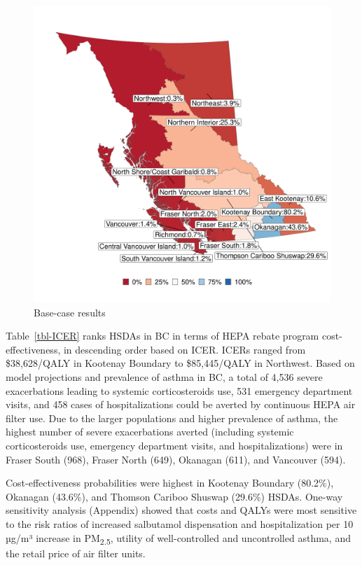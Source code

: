 \documentclass[
  number]{elsarticle}
\begin{document}
\begin{figure}
\begin{minipage}[t]{0.50\linewidth}
{{\includegraphics{index_files/figure-pdf/fig-ICER-2.pdf}

}

}

\end{minipage}%

\caption{\label{fig-ICER}Base-case results}

\end{figure}

Table~\ref{tbl-ICER} ranks HSDAs in BC in terms of HEPA rebate program
cost-effectiveness, in descending order based on ICER. ICERs ranged from
\$38,628/QALY in Kootenay Boundary to \$85,445/QALY in Northwest. Based
on model projections and prevalence of asthma in BC, a total of 4,536
severe exacerbations leading to systemic corticosteroids use, 531
emergency department visits, and 458 cases of hospitalizations could be
averted by continuous HEPA air filter use. Due to the larger populations
and higher prevalence of asthma, the highest number of severe
exacerbations averted (including systemic corticosteroids use, emergency
department visits, and hospitalizations) were in Fraser South (968),
Fraser North (649), Okanagan (611), and Vancouver (594).

Cost-effectiveness probabilities were highest in Kootenay Boundary
(80.2\%), Okanagan (43.6\%), and Thomson Cariboo Shuswap (29.6\%) HSDAs.
One-way sensitivity analysis (Appendix) showed that costs and QALYs were
most sensitive to the risk ratios of increased salbutamol dispensation
and hospitalization per 10 µg/m³ increase in PM\textsubscript{2.5},
utility of well-controlled and uncontrolled asthma, and the retail price
of air filter units.
\end{document}
